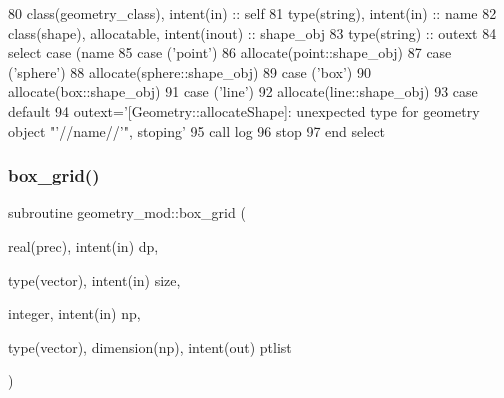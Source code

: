 \begin{DoxyCode}
80     \textcolor{keywordtype}{class}(geometry\_class), \textcolor{keywordtype}{intent(in)} :: self
81     \textcolor{keywordtype}{type}(string), \textcolor{keywordtype}{intent(in)} :: name
82     \textcolor{keywordtype}{class}(shape), \textcolor{keywordtype}{allocatable}, \textcolor{keywordtype}{intent(inout)} :: shape\_obj
83     \textcolor{keywordtype}{type}(string) :: outext
84     \textcolor{keywordflow}{select case} (name%
85     \textcolor{keywordflow}{case} (\textcolor{stringliteral}{'point'})
86         \textcolor{keyword}{allocate}(point::shape\_obj)
87     \textcolor{keywordflow}{case} (\textcolor{stringliteral}{'sphere'})
88         \textcolor{keyword}{allocate}(sphere::shape\_obj)
89     \textcolor{keywordflow}{case} (\textcolor{stringliteral}{'box'})
90         \textcolor{keyword}{allocate}(box::shape\_obj)
91     \textcolor{keywordflow}{case} (\textcolor{stringliteral}{'line'})
92         \textcolor{keyword}{allocate}(line::shape\_obj)
93 \textcolor{keywordflow}{    case default}
94         outext=\textcolor{stringliteral}{'[Geometry::allocateShape]: unexpected type for geometry object "'}//name//\textcolor{stringliteral}{'", stoping'}
95         \textcolor{keyword}{call }log%
96         stop
97 \textcolor{keywordflow}{    end select}
\end{DoxyCode}
\mbox{\label{namespacegeometry__mod_ae87e4ecff2d21a839da2b82919b5fd0b}} 
\subsubsection{\texorpdfstring{box\+\_\+grid()}{box\_grid()}}
{\footnotesize\ttfamily subroutine geometry\+\_\+mod\+::box\+\_\+grid (\begin{DoxyParamCaption}\item[{real(prec), intent(in)}]{dp,  }\item[{type(vector), intent(in)}]{size,  }\item[{integer, intent(in)}]{np,  }\item[{type(vector), dimension(np), intent(out)}]{ptlist }\end{DoxyParamCaption})\hspace{0.3cm}{\ttfamily [private]}}



